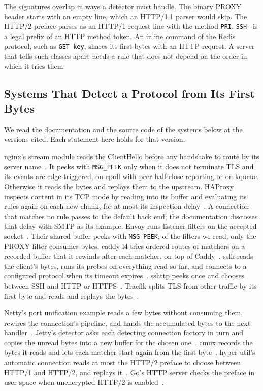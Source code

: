 The signatures overlap in ways a detector must handle. The binary PROXY header starts with an
empty line, which an HTTP/1.1 parser would skip. The HTTP/2 preface parses as an HTTP/1 request
line with the method \texttt{PRI}. \texttt{SSH-} is a legal prefix of an HTTP method token. An
inline command of the Redis protocol, such as \texttt{GET key}, shares its first bytes with an
HTTP request. A server that tells such classes apart needs a rule that does not depend on the
order in which it tries them.

\subsection{Systems That Detect a Protocol from Its First Bytes}\label{sec:systems}

We read the documentation and the source code of the systems below at the versions cited. Each
statement here holds for that version.

 nginx's stream module reads the ClientHello before any handshake to route by its
server name~\cite{nginx2026}. It peeks with \texttt{MSG\_PEEK} only when it does not terminate TLS
and its events are edge-triggered, on epoll with peer half-close reporting or on kqueue. Otherwise
it reads the bytes and replays them to the upstream. HAProxy inspects content in its
TCP mode by reading into its buffer and evaluating its rules again on each new chunk, for at most
its inspection delay~\cite{haproxy2026}. A connection that matches no rule passes to the default
back end; the documentation discusses that delay with SMTP as its example. Envoy runs listener
filters on the accepted socket~\cite{envoy2026}. Their shared buffer peeks with
\texttt{MSG\_PEEK}; of the filters we read, only the PROXY filter consumes bytes. caddy-l4 tries ordered routes of matchers on a recorded
buffer that it rewinds after each matcher, on top of Caddy~\cite{caddyl42026,caddy2026}. sslh reads
the client's bytes, runs its probes on everything read so far, and connects to a configured
protocol when its timeout expires~\cite{sslh2026}. sshttp peeks once and chooses between SSH and
HTTP or HTTPS~\cite{sshttp2023}. Traefik splits TLS from other traffic by its first byte and reads
and replays the bytes~\cite{traefik2026}.

 Netty's port unification example reads a few bytes without consuming them,
rewires the connection's pipeline, and hands the accumulated bytes to the next
handler~\cite{netty2026}. Jetty's detector asks each detecting connection factory in turn and
copies the unread bytes into a new buffer for the chosen one~\cite{jetty2026}. cmux records the
bytes it reads and lets each matcher start again from the first byte~\cite{cmux2021}.
hyper-util's automatic connection reads at most the HTTP/2 preface to choose between HTTP/1 and
HTTP/2, and replays it~\cite{hyperutil2026}. Go's HTTP server checks the preface in user space
when unencrypted HTTP/2 is enabled~\cite{go2026}.

